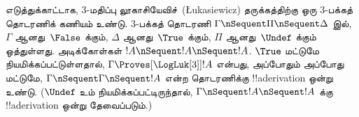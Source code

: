 \documentclass[../../../include/open-logic-section]{subfiles}
\begin{document}
எடுத்துக்காட்டாக, $3$-மதிப்பு லூகாசியேவிச்~(\L ukasiewicz) தருக்கத்திற்கு
ஒரு $3$-பக்கத் தொடரணிக் கணியம் உண்டு. $3$-பக்கத் தொடரணி
$\Gamma \nSequent \Pi \nSequent \Delta$ இல், $\Gamma$ ஆனது~$\False$
க்கும், $\Delta$ ஆனது~$\True$ க்கும், $\Pi$ ஆனது~$\Undef$ க்கும்
ஒத்துள்ளது. அடிக்கோள்கள் $!A \nSequent !A \nSequent !A$. $\True$ மட்டுமே
நியமிக்கப்பட்டுள்ளதால், $\Gamma \Proves[\LogLuk[3]] !A$ என்பது,
அப்போதும் அப்போது மட்டுமே, $\Gamma \nSequent \Gamma \nSequent !A$ என்ற
தொடரணிக்கு !!a{derivation} ஒன்று உண்டு. ($\Undef$ உம் நியமிக்கப்பட்டிருந்தால்,
$\Gamma \nSequent !A \nSequent !A$ க்கு !!a{derivation} ஒன்று தேவைப்படும்.)
\end{document}

